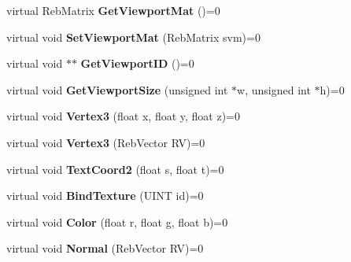 \begin{DoxyCompactItemize}
\item 
virtual Reb\+Matrix {\bfseries Get\+Viewport\+Mat} ()=0\hypertarget{class_i_render_device_afbb14912ab2b16f877c8c2c0a95e3d19}{}\label{class_i_render_device_afbb14912ab2b16f877c8c2c0a95e3d19}

\item 
virtual void {\bfseries Set\+Viewport\+Mat} (Reb\+Matrix svm)=0\hypertarget{class_i_render_device_a2b140ca8359f8d1db140377d63f5bcd9}{}\label{class_i_render_device_a2b140ca8359f8d1db140377d63f5bcd9}

\item 
virtual void $\ast$$\ast$ {\bfseries Get\+Viewport\+ID} ()=0\hypertarget{class_i_render_device_af5e8aac7e387d292b3d8230b9172dd2d}{}\label{class_i_render_device_af5e8aac7e387d292b3d8230b9172dd2d}

\item 
virtual void {\bfseries Get\+Viewport\+Size} (unsigned int $\ast$w, unsigned int $\ast$h)=0\hypertarget{class_i_render_device_a08eb14b6505ea5041fa0ba59be27ae95}{}\label{class_i_render_device_a08eb14b6505ea5041fa0ba59be27ae95}

\item 
virtual void {\bfseries Vertex3} (float x, float y, float z)=0\hypertarget{class_i_render_device_a3c41091e87f2a22f06f15bccb22d5bd9}{}\label{class_i_render_device_a3c41091e87f2a22f06f15bccb22d5bd9}

\item 
virtual void {\bfseries Vertex3} (Reb\+Vector RV)=0\hypertarget{class_i_render_device_a20465c217d9872d0771c2ac733894c25}{}\label{class_i_render_device_a20465c217d9872d0771c2ac733894c25}

\item 
virtual void {\bfseries Text\+Coord2} (float s, float t)=0\hypertarget{class_i_render_device_a1eff2e2033bdec9770439ed0b1549eba}{}\label{class_i_render_device_a1eff2e2033bdec9770439ed0b1549eba}

\item 
virtual void {\bfseries Bind\+Texture} (U\+I\+NT id)=0\hypertarget{class_i_render_device_afa8bd61e8f1e35aabeb682dcd9e2ba2d}{}\label{class_i_render_device_afa8bd61e8f1e35aabeb682dcd9e2ba2d}

\item 
virtual void {\bfseries Color} (float r, float g, float b)=0\hypertarget{class_i_render_device_a40b9937f1159418d167adf0c236114a8}{}\label{class_i_render_device_a40b9937f1159418d167adf0c236114a8}

\item 
virtual void {\bfseries Normal} (Reb\+Vector RV)=0\hypertarget{class_i_render_device_a6296df797d253c2c4a7e5e717356102a}{}\label{class_i_render_device_a6296df797d253c2c4a7e5e717356102a}


\end{DoxyCompactItemize}
